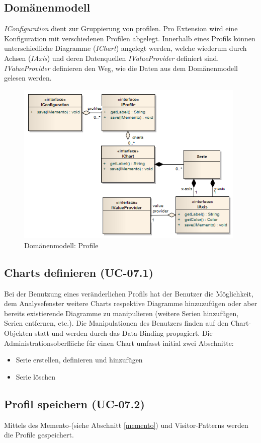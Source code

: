 \subsection{Domänenmodell}
\textit{IConfiguration} dient zur Gruppierung von profilen. Pro Extension wird eine Konfiguration mit verschiedenen Profilen abgelegt. Innerhalb eines Profils können unterschiedliche Diagramme (\textit{IChart}) angelegt werden, welche wiederum durch Achsen (\textit{IAxis}) und deren Datenquellen \textit{IValueProvider} definiert sind. \textit{IValueProvider} definieren den Weg, wie die Daten aus dem Domänenmodell gelesen werden.
 \begin{figure}[H]
  	\centering
    	\includegraphics[width=11cm]{images/core_domain_profiles}
        	\caption{Domänenmodell: Profile}
\end{figure}

\subsection{Charts definieren (UC-07.1)}
Bei der Benutzung eines veränderlichen Profils hat der Benutzer die Möglichkeit, dem Analysefenster weitere Charts respektive Diagramme hinzuzufügen oder aber bereits existierende Diagramme zu manipulieren (weitere Serien hinzufügen, Serien entfernen, etc.). Die Manipulationen des Benutzers finden auf den Chart-Objekten statt und werden durch das Data-Binding propagiert. Die Administrationsoberfläche für einen Chart umfasst initial zwei Abschnitte:
\begin{itemize}
	\item Serie erstellen, definieren und hinzufügen
	 \item Serie löschen
\end{itemize}

\subsection{Profil speichern (UC-07.2)}
Mittels des Memento-(siehe Abschnitt \ref{memento}) und Visitor-Patterns\cite[S. 331]{gamma1995design} werden die Profile gespeichert.

